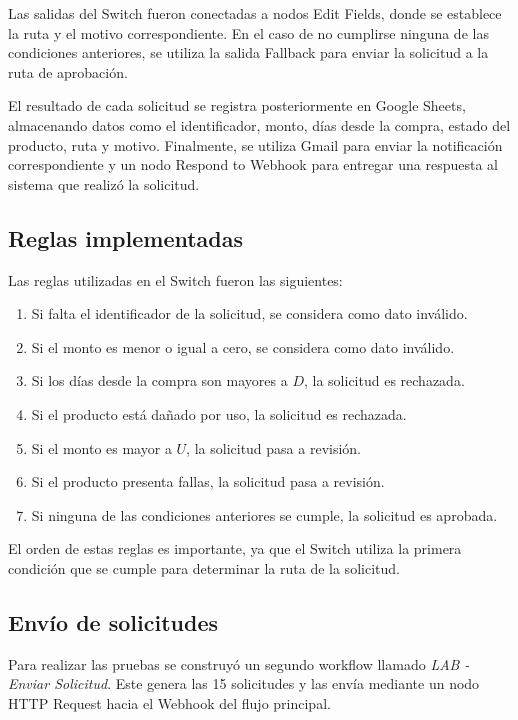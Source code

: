 \documentclass[11pt]{article}
\begin{document}
Las salidas del Switch fueron conectadas a nodos Edit Fields, donde se establece la ruta y el motivo correspondiente. En el caso de no cumplirse ninguna de las condiciones anteriores, se utiliza la salida Fallback para enviar la solicitud a la ruta de aprobación.

El resultado de cada solicitud se registra posteriormente en Google Sheets, almacenando datos como el identificador, monto, días desde la compra, estado del producto, ruta y motivo. Finalmente, se utiliza Gmail para enviar la notificación correspondiente y un nodo Respond to Webhook para entregar una respuesta al sistema que realizó la solicitud.

\subsection{Reglas implementadas}

Las reglas utilizadas en el Switch fueron las siguientes:

\begin{enumerate}
    \item Si falta el identificador de la solicitud, se considera como dato inválido.
    \item Si el monto es menor o igual a cero, se considera como dato inválido.
    \item Si los días desde la compra son mayores a $D$, la solicitud es rechazada.
    \item Si el producto está dañado por uso, la solicitud es rechazada.
    \item Si el monto es mayor a $U$, la solicitud pasa a revisión.
    \item Si el producto presenta fallas, la solicitud pasa a revisión.
    \item Si ninguna de las condiciones anteriores se cumple, la solicitud es aprobada.
\end{enumerate}

El orden de estas reglas es importante, ya que el Switch utiliza la primera condición que se cumple para determinar la ruta de la solicitud.

\subsection{Envío de solicitudes}

Para realizar las pruebas se construyó un segundo workflow llamado
\textit{LAB - Enviar Solicitud}. Este genera las 15 solicitudes y las envía
mediante un nodo HTTP Request hacia el Webhook del flujo principal.
\end{document}
